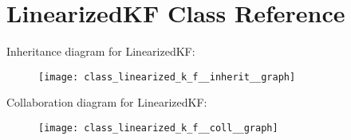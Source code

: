 \hypertarget{class_linearized_k_f}{\section{\-Linearized\-K\-F \-Class \-Reference}
\label{class_linearized_k_f}
}


\-Inheritance diagram for \-Linearized\-K\-F\-:\nopagebreak
\begin{figure}[H]
\begin{center}
\leavevmode
\texttt{[image: class\_linearized\_k\_f\_\_inherit\_\_graph]}
\end{center}
\end{figure}


\-Collaboration diagram for \-Linearized\-K\-F\-:\nopagebreak
\begin{figure}[H]
\begin{center}
\leavevmode
\texttt{[image: class\_linearized\_k\_f\_\_coll\_\_graph]}
\end{center}
\end{figure}
